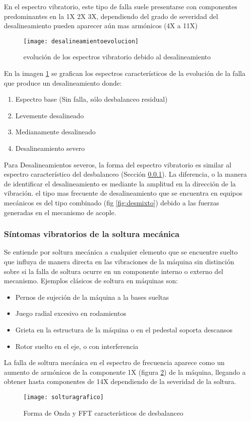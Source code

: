 	 				En el espectro vibratorio, este tipo de falla suele presentarse con componentes predominantes en la 1X 2X 3X, dependiendo del grado de severidad del desalineamiento pueden aparecer aún mas armónicos (4X a 11X)
	 				\begin{figure}
		 				\centering
		 				\texttt{[image: desalineamientoevolucion]}
		 				\caption{evolución de los espectros vibratorio debido al desalineamiento}
		 				\label{fig:desalevolucion} 				
	 				\end{figure}
	 				En la imagen \ref{fig:desalevolucion} se grafican los espectros característicos de la evolución de la falla que produce un desalineamiento donde:
	 				\begin{enumerate}
		 				\item Espectro base (Sin falla, sólo desbalanceo residual)
		 				\item Levemente desalineado
		 				\item Medianamente desalineado
		 				\item Desalineamiento severo 				
		 			\end{enumerate}
	 				Para Desalineamientos severos, la forma del espectro vibratorio es similar al espectro característico del desbalanceo (Sección \ref{sssec:soltura}). La diferencia, o la manera de identificar el desalineamiento es mediante la amplitud en la dirección de la vibración. el tipo mas frecuente de desalineamiento que se encuentra en equipos mecánicos es del tipo combinado (fig \ref{fig:desmixto}) debido a las fuerzas generadas en el mecanismo de acople.
	 				
	 			\subsubsection{Síntomas vibratorios de la soltura mecánica} \label{sssec:soltura}
	 				Se entiende por soltura mecánica a cualquier elemento que se encuentre suelto que influya de manera directa en las vibraciones de la máquina sin distinción sobre si la falla de soltura ocurre en un componente interno o externo del mecanismo. Ejemplos clásicos de soltura en máquinas son:
	 				\begin{itemize}
	 					\item Pernos de sujeción de la máquina a la bases sueltas
	 					\item Juego radial excesivo en rodamientos
	 					\item Grieta en la estructura de la máquina o en el pedestal soporta descansos
	 					\item Rotor suelto en el eje, o con interferencia
	 				\end{itemize}
 					La falla de soltura mecánica en el espectro de frecuencia aparece como un aumento de armónicos de la componente 1X (figura \ref{fig:solturagrafico}) de la máquina, llegando a obtener hasta componentes de 14X dependiendo de la severidad de la soltura.
 					\begin{figure}[H]
 						\centering
 						\texttt{[image: solturagrafico]}
 						\caption{Forma de Onda y FFT característicos de desbalanceo}
 						\label{fig:solturagrafico}
 					\end{figure}

